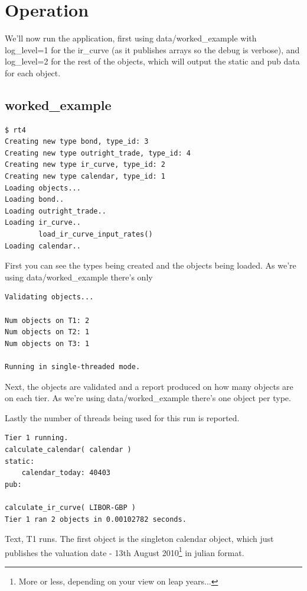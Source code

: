 \documentclass{report}
\begin{document}
\section{Operation}

We'll now run the application, first using data/worked_example with log_level=1 for the ir_curve (as it publishes arrays so the debug is verbose), and log_level=2 for the rest of the objects, which will output the static and pub data for each object.

\subsection{worked_example}
 
\begin{verbatim}
$ rt4
Creating new type bond, type_id: 3
Creating new type outright_trade, type_id: 4
Creating new type ir_curve, type_id: 2
Creating new type calendar, type_id: 1
Loading objects...
Loading bond..
Loading outright_trade..
Loading ir_curve..
        load_ir_curve_input_rates()
Loading calendar..

\end{verbatim}

First you can see the types being created and the objects being loaded. As we're using data/worked_example there's only

\begin{verbatim}
Validating objects...

Num objects on T1: 2
Num objects on T2: 1
Num objects on T3: 1

Running in single-threaded mode.
\end{verbatim}

Next, the objects are validated and a report produced on how many objects are on each tier. As we're using data/worked_example there's one object per type. 

Lastly the number of threads being used for this run is reported.

\begin{verbatim}
Tier 1 running.
calculate_calendar( calendar )
static:
    calendar_today: 40403
pub:

calculate_ir_curve( LIBOR-GBP )
Tier 1 ran 2 objects in 0.00102782 seconds.
\end{verbatim}

Text, T1 runs. The first object is the singleton calendar object, which just publishes the valuation date - 13th August 2010\footnote{More or less, depending on your view on leap years...} in julian format.
\end{document}
